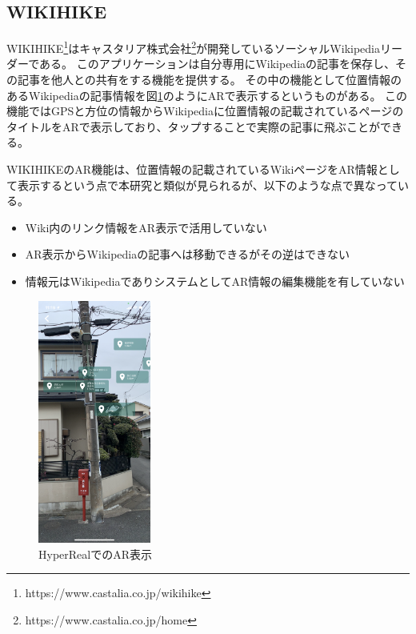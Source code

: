 \subsection{WIKIHIKE}
WIKIHIKE\footnote{\textsf{https://www.castalia.co.jp/wikihike}}はキャスタリア株式会社\footnote{\textsf{https://www.castalia.co.jp/home}}が開発しているソーシャルWikipediaリーダーである。
このアプリケーションは自分専用にWikipediaの記事を保存し、その記事を他人との共有をする機能を提供する。
その中の機能として位置情報のあるWikipediaの記事情報を図\ref{fig:wikihike}のようにARで表示するというものがある。
この機能ではGPSと方位の情報からWikipediaに位置情報の記載されているページのタイトルをARで表示しており、タップすることで実際の記事に飛ぶことができる。

WIKIHIKEのAR機能は、位置情報の記載されているWikiページをAR情報として表示するという点で本研究と類似が見られるが、以下のような点で異なっている。
\begin{itemize}
  \item Wiki内のリンク情報をAR表示で活用していない
  \item AR表示からWikipediaの記事へは移動できるがその逆はできない
  \item 情報元はWikipediaでありシステムとしてAR情報の編集機能を有していない
\end{itemize}

\begin{figure}[H]
  \centering 
  \includegraphics[height=80mm]{images/wikihike.png}
  \caption{HyperRealでのAR表示} \label{fig:wikihike}
\end{figure}

